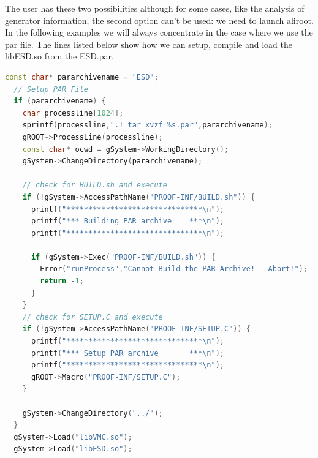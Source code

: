 The user has these two possibilities although for some cases, like the analysis of generator information, the second option can't be used: we need to launch aliroot. In the following examples we will always concentrate in the case where we use the {\ttfamily par file}. The lines listed below show how we can setup, compile and load the libESD.so from the {\ttfamily ESD.par}.

\vspace{2 cm}

\begin{lstlisting}[language=C++]
  const char* pararchivename = "ESD";
  // Setup PAR File
  if (pararchivename) {
    char processline[1024];
    sprintf(processline,".! tar xvzf %s.par",pararchivename);
    gROOT->ProcessLine(processline);
    const char* ocwd = gSystem->WorkingDirectory();
    gSystem->ChangeDirectory(pararchivename);

    // check for BUILD.sh and execute
    if (!gSystem->AccessPathName("PROOF-INF/BUILD.sh")) {
      printf("*******************************\n");
      printf("*** Building PAR archive    ***\n");
      printf("*******************************\n");

      if (gSystem->Exec("PROOF-INF/BUILD.sh")) {
        Error("runProcess","Cannot Build the PAR Archive! - Abort!");
        return -1;
      }
    }
    // check for SETUP.C and execute
    if (!gSystem->AccessPathName("PROOF-INF/SETUP.C")) {
      printf("*******************************\n");
      printf("*** Setup PAR archive       ***\n");
      printf("*******************************\n");
      gROOT->Macro("PROOF-INF/SETUP.C");
    }
    
    gSystem->ChangeDirectory("../");
  }
  gSystem->Load("libVMC.so");
  gSystem->Load("libESD.so");
\end{lstlisting}

